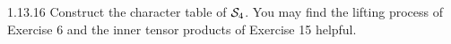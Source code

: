 \documentclass{../../math174}
\date{2019 March 27 (Wednesday)}
\author{}
\begin{document}
\begin{problemlist}
\item[1.13.16] Construct the character table of \(\mathcal S_4\).  You
  may find the lifting process of Exercise 6 and the inner tensor
  products of Exercise 15 helpful.

  \begin{solution}

  \end{solution}
\end{problemlist}
\end{document}
